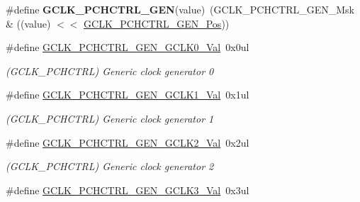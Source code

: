 \begin{DoxyCompactItemize}
\item 
\hypertarget{group___s_a_m_l21___g_c_l_k_ga31d53125a2607d277a7a5900944b572f}{}\#define {\bfseries G\+C\+L\+K\+\_\+\+P\+C\+H\+C\+T\+R\+L\+\_\+\+G\+E\+N}(value)~(G\+C\+L\+K\+\_\+\+P\+C\+H\+C\+T\+R\+L\+\_\+\+G\+E\+N\+\_\+\+Msk \& ((value) $<$$<$ \hyperlink{group___s_a_m_l21___g_c_l_k_ga43f3e8ba61616cbd7885f4c9ebfb5942}{G\+C\+L\+K\+\_\+\+P\+C\+H\+C\+T\+R\+L\+\_\+\+G\+E\+N\+\_\+\+Pos}))\label{group___s_a_m_l21___g_c_l_k_ga31d53125a2607d277a7a5900944b572f}

\item 
\hypertarget{group___s_a_m_l21___g_c_l_k_ga0cdef65a9bb3f8c6df6b6d1496234af3}{}\#define \hyperlink{group___s_a_m_l21___g_c_l_k_ga0cdef65a9bb3f8c6df6b6d1496234af3}{G\+C\+L\+K\+\_\+\+P\+C\+H\+C\+T\+R\+L\+\_\+\+G\+E\+N\+\_\+\+G\+C\+L\+K0\+\_\+\+Val}~0x0ul\label{group___s_a_m_l21___g_c_l_k_ga0cdef65a9bb3f8c6df6b6d1496234af3}

\begin{DoxyCompactList}\small\item\em (G\+C\+L\+K\+\_\+\+P\+C\+H\+C\+T\+R\+L) Generic clock generator 0 \end{DoxyCompactList}\item 
\hypertarget{group___s_a_m_l21___g_c_l_k_gaa7676f67f8a1f0b2bb0cfbc31fde5863}{}\#define \hyperlink{group___s_a_m_l21___g_c_l_k_gaa7676f67f8a1f0b2bb0cfbc31fde5863}{G\+C\+L\+K\+\_\+\+P\+C\+H\+C\+T\+R\+L\+\_\+\+G\+E\+N\+\_\+\+G\+C\+L\+K1\+\_\+\+Val}~0x1ul\label{group___s_a_m_l21___g_c_l_k_gaa7676f67f8a1f0b2bb0cfbc31fde5863}

\begin{DoxyCompactList}\small\item\em (G\+C\+L\+K\+\_\+\+P\+C\+H\+C\+T\+R\+L) Generic clock generator 1 \end{DoxyCompactList}\item 
\hypertarget{group___s_a_m_l21___g_c_l_k_ga8cf0d7436042a4cfe4776fdbc8942f57}{}\#define \hyperlink{group___s_a_m_l21___g_c_l_k_ga8cf0d7436042a4cfe4776fdbc8942f57}{G\+C\+L\+K\+\_\+\+P\+C\+H\+C\+T\+R\+L\+\_\+\+G\+E\+N\+\_\+\+G\+C\+L\+K2\+\_\+\+Val}~0x2ul\label{group___s_a_m_l21___g_c_l_k_ga8cf0d7436042a4cfe4776fdbc8942f57}

\begin{DoxyCompactList}\small\item\em (G\+C\+L\+K\+\_\+\+P\+C\+H\+C\+T\+R\+L) Generic clock generator 2 \end{DoxyCompactList}\item 
\hypertarget{group___s_a_m_l21___g_c_l_k_gaf24b4356f07e8ba81882e8eace7007c8}{}\#define \hyperlink{group___s_a_m_l21___g_c_l_k_gaf24b4356f07e8ba81882e8eace7007c8}{G\+C\+L\+K\+\_\+\+P\+C\+H\+C\+T\+R\+L\+\_\+\+G\+E\+N\+\_\+\+G\+C\+L\+K3\+\_\+\+Val}~0x3ul\label{group___s_a_m_l21___g_c_l_k_gaf24b4356f07e8ba81882e8eace7007c8}


\end{DoxyCompactItemize}
